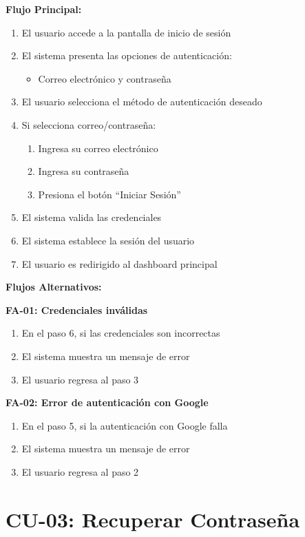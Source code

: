 \noindent\textbf{Flujo Principal:}
\begin{enumerate}
    \item El usuario accede a la pantalla de inicio de sesión
    \item El sistema presenta las opciones de autenticación:
    \begin{itemize}
        \item Correo electrónico y contraseña
    \end{itemize}
    \item El usuario selecciona el método de autenticación deseado
    \item Si selecciona correo/contraseña:
    \begin{enumerate}
        \item Ingresa su correo electrónico
        \item Ingresa su contraseña
        \item Presiona el botón ``Iniciar Sesión''
    \end{enumerate}
    \item El sistema valida las credenciales
    \item El sistema establece la sesión del usuario
    \item El usuario es redirigido al dashboard principal
\end{enumerate}

\noindent\textbf{Flujos Alternativos:}

\textbf{FA-01: Credenciales inválidas}
\begin{enumerate}
    \item En el paso 6, si las credenciales son incorrectas
    \item El sistema muestra un mensaje de error
    \item El usuario regresa al paso 3
\end{enumerate}

\textbf{FA-02: Error de autenticación con Google}
\begin{enumerate}
    \item En el paso 5, si la autenticación con Google falla
    \item El sistema muestra un mensaje de error
    \item El usuario regresa al paso 2
\end{enumerate}

\section{CU-03: Recuperar Contraseña}

